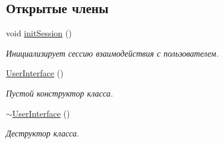 \subsection*{Открытые члены}
\begin{DoxyCompactItemize}
\item 
void \hyperlink{class_user_interface_a6c7f9ef9faa40eaf4760d57e89228786}{init\+Session} ()
\begin{DoxyCompactList}\small\item\em Инициализирует сессию взаимодействия с пользователем. \end{DoxyCompactList}\item 
\hyperlink{class_user_interface_ae6fb70370701b3bd6120e923df9705b0}{User\+Interface} ()
\begin{DoxyCompactList}\small\item\em Пустой конструктор класса. \end{DoxyCompactList}\item 
\hyperlink{class_user_interface_ae588b2ff1711a016dd4c6fc5002c0841}{$\sim$\+User\+Interface} ()
\begin{DoxyCompactList}\small\item\em Деструктор класса. \end{DoxyCompactList}\end{DoxyCompactItemize}
